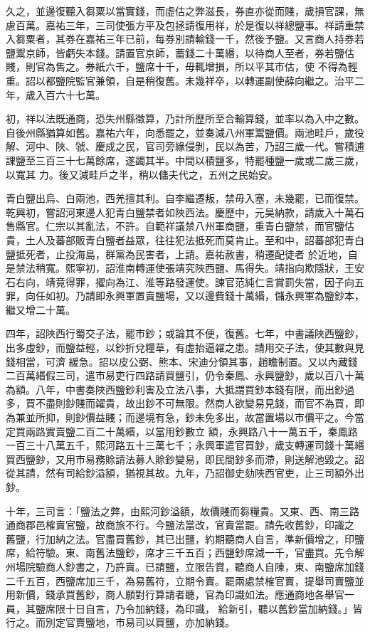 \begin{pinyinscope}
 久之，並邊復聽入芻粟以當實錢，而虛估之弊滋長，券直亦從而賤，歲損官課，無慮百萬。嘉祐三年，三司使張方平及包拯請復用祥，於是復以祥總鹽事。祥請重禁入芻粟者，其券在嘉祐三年已前，每券別請輸錢一千，然後予鹽。又言商人持券若鹽鬻京師，皆虧失本錢。請置官京師，蓄錢二十萬緡，以待商人至者，券若鹽估賤，則官為售之。券紙六千，鹽席十千，毋輒增損，所以平其市估，使
 不得為輕重。詔以都鹽院監官兼領，自是稍復舊。未幾祥卒，以轉運副使薛向繼之。治平二年，歲入百六十七萬。



 初，祥以法既通商，恐失州縣徵算，乃計所歷所至合輸算錢，並率以為入中之數。自後州縣猶算如舊。嘉祐六年，向悉罷之，並奏減八州軍鬻鹽價。兩池畦戶，歲役解、河中、陜、虢、慶成之民，官司旁緣侵剝，民以為苦，乃詔三歲一代。嘗積逋課鹽至三百三十七萬餘席，遂蠲其半。中間以積鹽多，特罷種鹽一歲或二歲三歲，以寬其
 力。後又減畦戶之半，稍以傭夫代之，五州之民始安。



 青白鹽出烏、白兩池，西羌擅其利。自李繼遷叛，禁毋入塞，未幾罷，已而復禁。乾興初，嘗詔河東邊人犯青白鹽禁者如陜西法。慶歷中，元昊納款，請歲入十萬石售縣官。仁宗以其亂法，不許。自範祥議禁八州軍商鹽，重青白鹽禁，而官鹽估貴，土人及蕃部販青白鹽者益眾，往往犯法抵死而莫肯止。至和中，詔蕃部犯青白鹽抵死者，止投海島，群黨為民害者，上請。嘉祐赦書，稍遷配徒者
 於近地，自是禁法稍寬。熙寧初，詔淮南轉運使張靖究陜西鹽、馬得失。靖指向欺隱狀，王安石右向，靖竟得罪，擢向為江、淮等路發運使。諫官范純仁言賞罰失當，因子向五罪，向任如初。乃請即永興軍置賣鹽場，又以邊費錢十萬緡，儲永興軍為鹽鈔本，繼又增二十萬。



 四年，詔陜西行蜀交子法，罷市鈔；或論其不便，復舊。七年，中書議陜西鹽鈔，出多虛鈔，而鹽益輕，以鈔折兌糧草，有虛抬逼糴之患。請用交子法，使其數與見錢相當，可濟
 緩急。詔以皮公弼、熊本、宋迪分領其事，趙瞻制置。又以內藏錢二百萬緡假三司，遣市易吏行四路請買鹽引，仍令秦鳳、永興鹽鈔，歲以百八十萬為額。八年，中書奏陜西鹽鈔利害及立法八事，大抵謂買鈔本錢有限，而出鈔過多，買不盡則鈔賤而糴貴，故出鈔不可無限。然商人欲變易見錢，而官不為買，即為兼並所抑，則鈔價益賤；而邊境有急，鈔未免多出，故當置場以市價平之。今當定買兩路實賣鹽二百二十萬緡，以當用鈔數立
 額，永興路八十一萬五千，秦鳳路一百三十八萬五千，熙河路五十三萬七千；永興軍遣官買鈔，歲支轉運司錢十萬緡買西鹽鈔，又用市易務賒請法募人賒鈔變易，即民間鈔多而滯，則送解池毀之。詔從其請，然有司給鈔溢額，猶視其故。九年，乃詔御史劾陜西官吏，止三司額外出鈔。



 十年，三司言：「鹽法之弊，由熙河鈔溢額，故價賤而芻糧貴。又東、西、南三路通商郡邑榷賣官鹽，故商旅不行。今鹽法當改，官賣當罷。請先收舊鈔，印識之
 舊鹽，行加納之法。官盡買舊鈔，其已出鹽，約期聽商人自言，準新價增之，印鹽席，給符驗。東、南舊法鹽鈔，席才三千五百；西鹽鈔席減一千，官盡買。先令解州場院驗商人鈔書之，乃許賣。已請鹽，立限告賞，聽商人自陳，東、南鹽席加錢二千五百，西鹽席加三千，為易舊符，立期令賣。罷兩處禁榷官賣，提舉司賣鹽並用新價，錢承買舊鈔，商人願對行算請者聽，官為印識如法。應通商地各舉官一員，其鹽席限十日自言，乃令加納錢，為印識，
 給新引，聽以舊鈔當加納錢。」皆行之。而別定官賣鹽地，市易司以買鹽，亦加納錢。




\end{pinyinscope}
